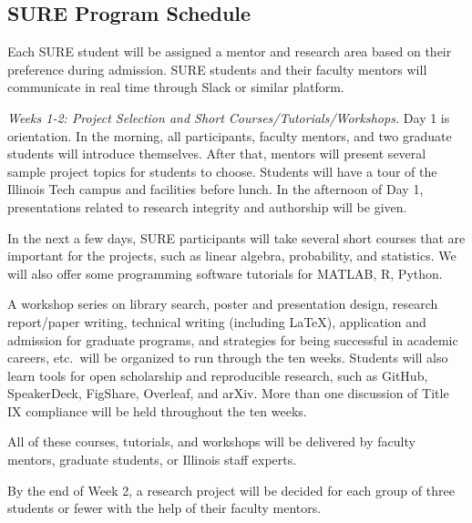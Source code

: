 \documentclass[11pt]{NSFamsart}
\begin{document}
\subsection{SURE Program Schedule}
\label{sec:SURESchedule}
Each SURE student will be
assigned a mentor and research area based on their preference during admission. SURE students and their faculty
mentors will communicate in real time through Slack or similar platform. 

\noindent \emph{Weeks 1-2: Project Selection and Short Courses/Tutorials/Workshops.}
Day 1 is orientation. In the morning,  all participants, faculty mentors, and two graduate students will introduce themselves. After that, mentors will present several sample project topics for students to choose.
Students will have a tour of the Illinois Tech campus and facilities before lunch. In the afternoon of Day 1,
presentations related to research integrity and authorship will be given.

In the next a few days,
SURE participants will take several short courses that are important for the projects, such as linear algebra, probability, and statistics. We will also offer some programming software tutorials for MATLAB, R, Python.

A workshop series on library search, poster and presentation design,
research report/paper writing, technical writing (including LaTeX), application and admission for
graduate programs, and strategies for being successful in academic careers, etc.\ will be organized to run through the ten weeks.  Students will also learn tools for open scholarship and reproducible research, such as GitHub, SpeakerDeck, FigShare, Overleaf, and arXiv.   More than one discussion of Title IX compliance will be held throughout the ten weeks.  

All of these courses, tutorials, and workshops will be delivered by faculty mentors, graduate students, or Illinois staff experts.

By the end of Week 2, a research project will be decided for each group of three students or fewer with the help of their faculty mentors.
\end{document}
